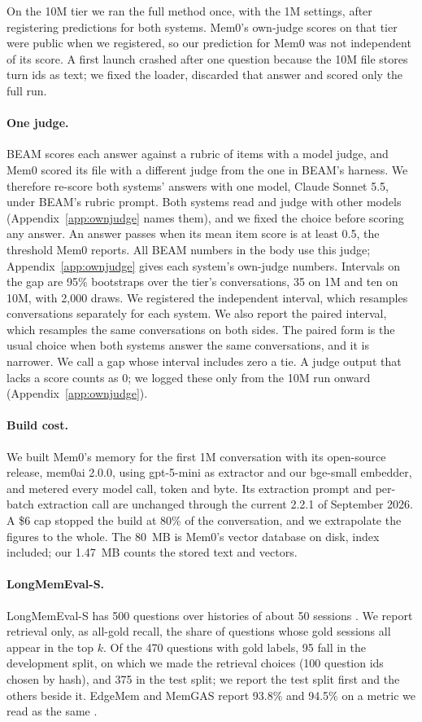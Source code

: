 On the 10M tier we ran the full method once, with the 1M settings, after registering predictions for both systems. Mem0's own-judge scores on that tier were public when we registered, so our prediction for Mem0 was not independent of its score. A first launch crashed after one question because the 10M file stores turn ids as text; we fixed the loader, discarded that answer and scored only the full run.

\paragraph{One judge.} BEAM scores each answer against a rubric of items with a model judge, and Mem0 scored its file with a different judge from the one in BEAM's harness. We therefore re-score both systems' answers with one model, Claude Sonnet 5.5, under BEAM's rubric prompt. Both systems read and judge with other models (Appendix~\ref{app:ownjudge} names them), and we fixed the choice before scoring any answer. An answer passes when its mean item score is at least 0.5, the threshold Mem0 reports. All BEAM numbers in the body use this judge; Appendix~\ref{app:ownjudge} gives each system's own-judge numbers. Intervals on the gap are 95\% bootstraps over the tier's conversations, 35 on 1M and ten on 10M, with 2,000 draws. We registered the independent interval, which resamples conversations separately for each system. We also report the paired interval, which resamples the same conversations on both sides. The paired form is the usual choice when both systems answer the same conversations, and it is narrower. We call a gap whose interval includes zero a tie. A judge output that lacks a score counts as 0; we logged these only from the 10M run onward (Appendix~\ref{app:ownjudge}).

\paragraph{Build cost.} We built Mem0's memory for the first 1M conversation with its open-source release, mem0ai 2.0.0, using gpt-5-mini as extractor and our bge-small embedder, and metered every model call, token and byte. Its extraction prompt and per-batch extraction call are unchanged through the current 2.2.1 of September 2026. A \$6 cap stopped the build at 80\% of the conversation, and we extrapolate the figures to the whole. The 80~MB is Mem0's vector database on disk, index included; our 1.47~MB counts the stored text and vectors.

\paragraph{LongMemEval-S.} LongMemEval-S has 500 questions over histories of about 50 sessions \citep{wu2025longmemeval}. We report retrieval only, as all-gold recall, the share of questions whose gold sessions all appear in the top $k$. Of the 470 questions with gold labels, 95 fall in the development split, on which we made the retrieval choices (100 question ids chosen by hash), and 375 in the test split; we report the test split first and the others beside it. EdgeMem and MemGAS report 93.8\% and 94.5\% on a metric we read as the same \citep{cui2026edgemem,xu2025memgas}.
